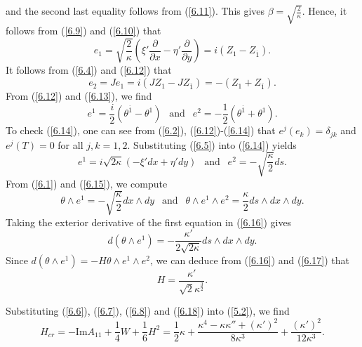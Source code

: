 \documentclass{amsart}
\theoremstyle{Corollary}
\numberwithin{equation}{section}
\begin{document}
and the second last equality follows from (\ref{6.11}). 
This gives $\beta=\displaystyle\sqrt{\frac{2}{\kappa}}$. 
Hence, it follows from (\ref{6.9}) and (\ref{6.10}) that 
\begin{equation}\label{6.12}
e_1=\sqrt{\frac{2}{\kappa}}\left(\xi'\frac{\partial}{\partial x}-\eta'\frac{\partial}{\partial y}\right)
=i(Z_1-Z_{\overline{1}}).
\end{equation}
It follows from (\ref{6.4}) and (\ref{6.12}) that
\begin{equation}\label{6.13}
e_2=J e_1=i(JZ_1-JZ_{\overline{1}})=-(Z_1+Z_{\overline{1}}).
\end{equation}
From (\ref{6.12}) and (\ref{6.13}), we find 
\begin{equation}\label{6.14}
e^1=\frac{i}{2}(\theta^{\overline{1}}-\theta^1)~~\mbox{ and }~~
e^2=-\frac{1}{2}(\theta^{\overline{1}}+\theta^1).
\end{equation}
To check (\ref{6.14}), one can see from (\ref{6.2}), (\ref{6.12})-(\ref{6.14}) that $e^j(e_k)=\delta_{jk}$
and $e^j(T)=0$ for all $j,k=1,2$. 
Substituting
(\ref{6.5})
into (\ref{6.14}) yields  
\begin{equation}\label{6.15}
e^1=i\sqrt{2\kappa}(-\xi'dx+\eta' dy)
~~\mbox{ and }~~e^2=-\sqrt{\frac{\kappa}{2}}ds.
\end{equation}
From (\ref{6.1}) and (\ref{6.15}), we compute 
\begin{equation}\label{6.16}
\theta\wedge e^1=-\sqrt{\frac{\kappa}{2}} dx\wedge dy
~~\mbox{ and }~~\theta\wedge e^1\wedge e^2=\frac{\kappa}{2}ds\wedge dx\wedge dy.
\end{equation}
Taking the exterior derivative of the first equation in (\ref{6.16}) gives 
\begin{equation}\label{6.17}
d(\theta\wedge e^1)=-\frac{\kappa'}{2\sqrt{2\kappa}}ds\wedge dx\wedge dy.
\end{equation}
Since $d(\theta\wedge e^1)=-H\theta\wedge e^1\wedge e^2$, 
we can deduce from (\ref{6.16}) and (\ref{6.17}) that 
\begin{equation}\label{6.18}
H=\frac{\kappa'}{\sqrt{2}\kappa^{\frac{3}{2}}}. 
\end{equation}



Substituting (\ref{6.6}), (\ref{6.7}), (\ref{6.8}) and (\ref{6.18}) into (\ref{5.2}), we find 
\begin{equation}\label{6.19}
H_{cr}=-\mbox{Im} A_{11}+\frac{1}{4}W+\frac{1}{6}H^2
=\frac{1}{2}\kappa+\frac{\kappa^4-\kappa\kappa''+(\kappa')^2}{8\kappa^3}
+\frac{(\kappa')^2}{12\kappa^3}.
\end{equation}
\end{document}
